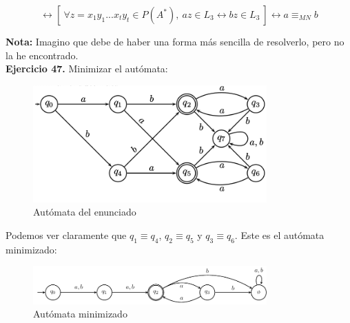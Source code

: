 \documentclass[11pt,a4paper]{article}
\begin{document}
$$\leftrightarrow [\ \forall z = x_1y_1...x_ty_t \in P(A^*), \ az \in L_3 \leftrightarrow bz \in L_3 \ ] \leftrightarrow a \equiv_{MN} b$$

\textbf{Nota:} Imagino que debe de haber una forma más sencilla de resolverlo, pero no la he encontrado. \\

\textbf{Ejercicio 47.} Minimizar el autómata:

\begin{figure}[H]
	\centering
	\includegraphics[width=0.8\textwidth]{afd_47_enunciado.png}
	\caption{Autómata del enunciado}
\end{figure}

Podemos ver claramente que $q_1 \equiv q_4$, $q_2 \equiv q_5$ y $q_3 \equiv q_6$. Este es el autómata minimizado:

\begin{figure}[H]
	\centering
	\includegraphics[width=0.8\textwidth]{afd_47.pdf}
	\caption{Autómata minimizado}
\end{figure}
\end{document}
